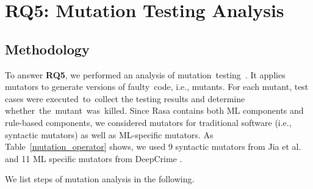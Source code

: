 
\section{RQ5: Mutation Testing Analysis}
\vspace{-3pt}
\subsection{Methodology}

To answer \textbf{RQ5}, we performed an analysis of mutation~testing~\cite{mutation_survey}. 
It applies mutators to generate versions of faulty~code, i.e., mutants. For each mutant, test cases were executed~to~collect the testing results and determine whether~the~mutant~was~killed. %
Since Rasa contains both ML components and rule-based components, we considered mutators for traditional software (i.e., syntactic mutators) as well as ML-specific mutators.
As Table~\ref{mutation_operator} shows, we used 9 syntactic mutators from Jia et al. \cite{JiaMutation} and 11 ML specific mutators from DeepCrime \cite{DeepCrime}. 

We list steps of mutation analysis in the following.

